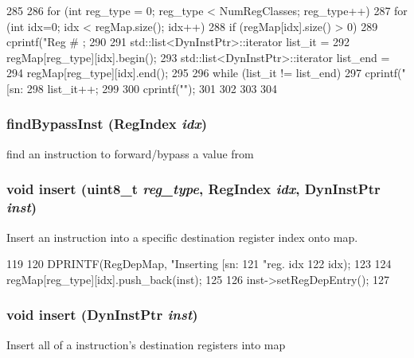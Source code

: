 \begin{DoxyCode}
285 {
286     for (int reg_type = 0; reg_type < NumRegClasses; reg_type++) {
287         for (int idx=0; idx < regMap.size(); idx++) {
288             if (regMap[idx].size() > 0) {
289                 cprintf("Reg #%
      ;
290 
291                 std::list<DynInstPtr>::iterator list_it =
292                     regMap[reg_type][idx].begin();
293                 std::list<DynInstPtr>::iterator list_end =
294                     regMap[reg_type][idx].end();
295 
296                 while (list_it != list_end) {
297                     cprintf("[sn:%
298                     list_it++;
299                 }
300                 cprintf("\n");
301             }
302         }
303     }    
304 }
\end{DoxyCode}
\hypertarget{classRegDepMap_a7f3dc7ca520ca37039329e5a63b2594a}{
\subsubsection[{findBypassInst}]{ findBypassInst ({\bf RegIndex} {\em idx})}}
\label{classRegDepMap_a7f3dc7ca520ca37039329e5a63b2594a}
find an instruction to forward/bypass a value from \hypertarget{classRegDepMap_a0044f4c5dc6146067ba193f8fe6f8842}{
\subsubsection[{insert}]{\setlength{\rightskip}{0pt plus 5cm}void insert (uint8\_\-t {\em reg\_\-type}, \/  {\bf RegIndex} {\em idx}, \/  {\bf DynInstPtr} {\em inst})}}
\label{classRegDepMap_a0044f4c5dc6146067ba193f8fe6f8842}
Insert an instruction into a specific destination register index onto map. 


\begin{DoxyCode}
119 {
120     DPRINTF(RegDepMap, "Inserting [sn:%
121             "reg. idx %
122             idx);
123 
124     regMap[reg_type][idx].push_back(inst);
125 
126     inst->setRegDepEntry();
127 }
\end{DoxyCode}
\hypertarget{classRegDepMap_ae55039f80e321715cf410a62b39d069c}{
\subsubsection[{insert}]{\setlength{\rightskip}{0pt plus 5cm}void insert ({\bf DynInstPtr} {\em inst})}}
\label{classRegDepMap_ae55039f80e321715cf410a62b39d069c}
Insert all of a instruction's destination registers into map 



